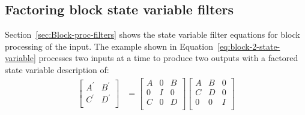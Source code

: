 \documentclass[a4paper,twoside,10pt,english]{report}
\begin{document}
\subsection{Factoring block state variable filters}
Section~\ref{sec:Block-proc-filters} shows the state variable filter equations 
for block processing of the input. The example shown in 
Equation~\ref{eq:block-2-state-variable} processes two inputs at a time to 
produce two outputs with a factored state variable description of:
\begin{align*}
\left[ \begin{array}{cc}
A^{\prime} & B^{\prime}\\ 
C^{\prime} & D^{\prime}\\
\end{array}\right]
 &= 
\left[ \begin{array}{ccc}
A & 0 & B\\ 
0 & I & 0\\
C & 0 & D\\
\end{array}\right]
\left[ \begin{array}{ccc}
A & B & 0\\ 
C & D & 0\\
0 & 0 & I\\
\end{array}\right]
\end{align*}
\end{document}
